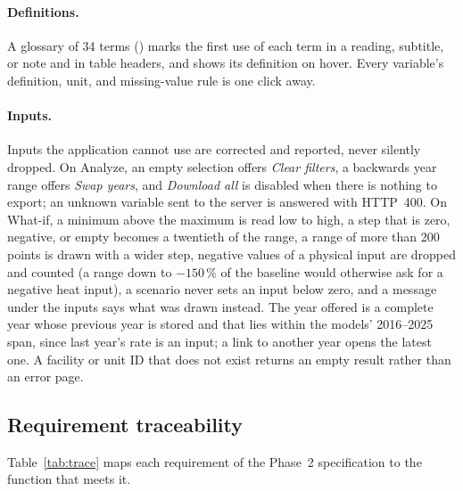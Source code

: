 \documentclass[11pt,a4paper]{article}
\begin{document}
\paragraph{Definitions.} A glossary of 34 terms () marks the first
use of each term in a reading, subtitle, or note and in table headers, and shows its definition on
hover. Every variable's definition, unit, and missing-value rule is one click away.

\paragraph{Inputs.} Inputs the application cannot use are corrected and reported, never silently
dropped. On Analyze, an empty selection offers \emph{Clear filters}, a backwards year range offers
\emph{Swap years}, and \emph{Download all} is disabled when there is nothing to export; an unknown
variable sent to the server is answered with HTTP~400. On What-if, a minimum above the maximum is
read low to high, a step that is zero, negative, or empty becomes a twentieth of the range, a
range of more than 200 points is drawn with a wider step, negative values of a physical input are
dropped and counted (a range down to $-150\,\%$ of the baseline would otherwise ask for a negative
heat input), a scenario never sets an input below zero, and a message under the inputs says what
was drawn instead. The year offered is a complete year whose previous year is stored and that lies
within the models' 2016--2025 span, since last year's \NOx{} rate is an input; a link to another
year opens the latest one. A facility or unit ID that does not exist returns an empty result rather than
an error page.

\subsection{Requirement traceability}

Table~\ref{tab:trace} maps each requirement of the Phase~2 specification to the function that
meets it.
\end{document}
